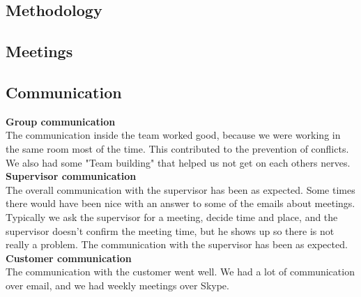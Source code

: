     \subsection{Methodology}
    \subsection{Meetings}
    \subsection{Communication}
    
        \indent \indent \textbf{Group communication} \\
        The communication inside the team worked good, because we were working in the same room most of the time. This contributed to the prevention of conflicts. We also had some "Team building" that helped us not get on each others nerves. 
        \\
        
        \textbf{Supervisor communication} \\
        The overall communication with the supervisor has been as expected. Some times there would have been nice with an answer to some of the emails about meetings. Typically we ask the supervisor for a meeting, decide time and place, and the supervisor doesn't confirm the meeting time, but he shows up so there is not really a problem. 
        The communication with the supervisor has been as expected. 
        \\ 
        
        \textbf{Customer communication} \\
        The communication with the customer went well. We had a lot of communication over email, and we had weekly meetings over Skype. 
        \\
        
